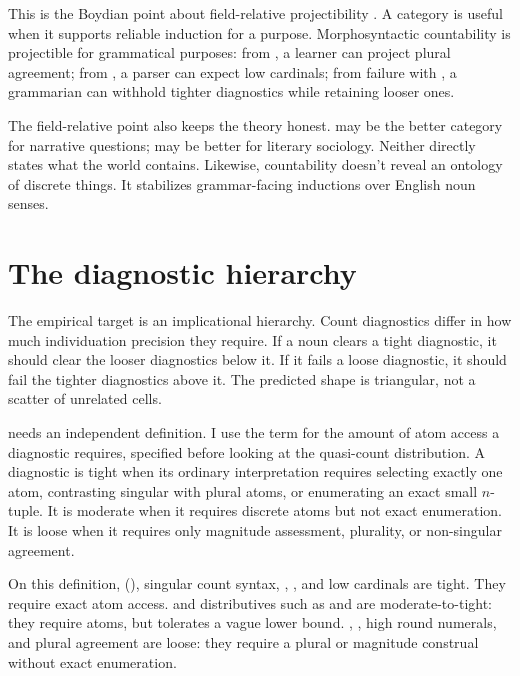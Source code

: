 \documentclass[12pt,a4paper]{article}
\begin{document}
This is the Boydian point about field-relative projectibility \citep{Goodman1955,boyd1991}. A category is useful when it supports reliable induction for a purpose. Morphosyntactic countability is projectible for grammatical purposes: from , a learner can project plural agreement; from , a parser can expect low cardinals; from failure with , a grammarian can withhold tighter diagnostics while retaining looser ones.

The field-relative point also keeps the theory honest.  may be the better category for narrative questions;  may be better for literary sociology. Neither directly states what the world contains. Likewise, countability doesn't reveal an ontology of discrete things. It stabilizes grammar-facing inductions over English noun senses.

\section{The diagnostic hierarchy}\label{sec:hierarchy-v3}

The empirical target is an implicational hierarchy. Count diagnostics differ in how much individuation precision they require. If a noun clears a tight diagnostic, it should clear the looser diagnostics below it. If it fails a loose diagnostic, it should fail the tighter diagnostics above it. The predicted shape is triangular, not a scatter of unrelated cells.

 needs an independent definition. I use the term for the amount of atom access a diagnostic requires, specified before looking at the quasi-count distribution. A diagnostic is tight when its ordinary interpretation requires selecting exactly one atom, contrasting singular with plural atoms, or enumerating an exact small $n$-tuple. It is moderate when it requires discrete atoms but not exact enumeration. It is loose when it requires only magnitude assessment, plurality, or non-singular agreement.

On this definition, (), singular count syntax, , , and low cardinals are tight. They require exact atom access.  and distributives such as  and  are moderate-to-tight: they require atoms, but  tolerates a vague lower bound. , , high round numerals, and plural agreement are loose: they require a plural or magnitude construal without exact enumeration.
\end{document}
